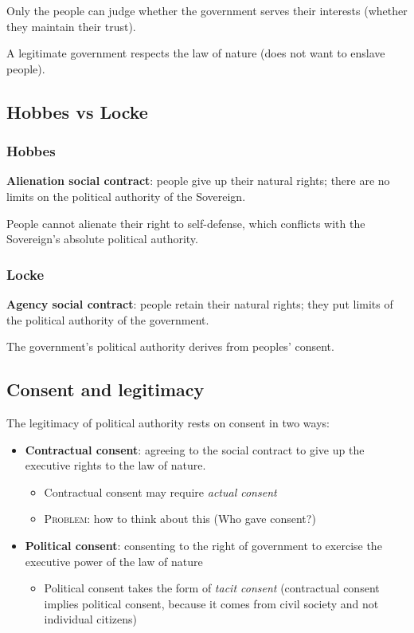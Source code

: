 Only the people can judge whether the government serves their interests (whether
they maintain their trust).

A legitimate government respects the law of nature (does not want to enslave
people).

\subsection{Hobbes vs Locke}

\subsubsection{Hobbes}

\textbf{Alienation social contract}: people give up their natural rights; there
are no limits on the political authority of the Sovereign.

People cannot alienate their right to self-defense, which conflicts with the
Sovereign's absolute political authority.

\subsubsection{Locke}

\textbf{Agency social contract}: people retain their natural rights; they put
limits of the political authority of the government.

The government's political authority derives from peoples' consent.

\subsection{Consent and legitimacy}

The legitimacy of political authority rests on consent in two ways:

\begin{itemize}
    \item \textbf{Contractual consent}: agreeing to the social contract to give
    up the executive rights to the law of nature.
        \begin{itemize}
            \item Contractual consent may require \textit{actual consent}
            \item \textsc{Problem}: how to think about this (Who gave consent?)
        \end{itemize}
    \item \textbf{Political consent}: consenting to the right of government to
    exercise the executive power of the law of nature
    \begin{itemize}
        \item Political consent takes the form of \textit{tacit consent}
        (contractual consent implies political consent, because it comes from
        civil society and not individual citizens)
    \end{itemize}
\end{itemize}

